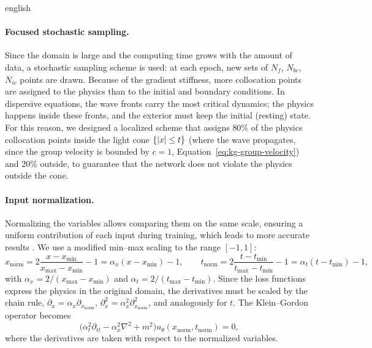 \begin{hyphenrules}{english}
\paragraph{Focused stochastic sampling.}\label{subsec:sampling}
Since the domain is large and the computing time grows with the amount of data, a stochastic sampling
scheme is used: at each epoch, new sets of $N_f$, $N_{bc}$, $N_{ic}$ points are drawn. Because of the
gradient stiffness, more collocation points are assigned to the physics than to the initial and boundary
conditions. In dispersive equations, the wave fronts carry the most critical dynamics; the physics happens
inside these fronts, and the exterior must keep the initial (resting) state. For this reason, we designed
a localized scheme that assigns $80\%$ of the physics collocation points inside the light cone
$\{\left\lvert x \right\rvert\le t\}$ (where the wave propagates, since the group velocity is bounded by $c=1$,
Equation~\eqref{eq:kg-group-velocity}) and $20\%$ outside, to guarantee that the network does not violate the physics
outside the cone.

\paragraph{Input normalization.}
Normalizing the variables allows comparing them on the same scale, ensuring a uniform contribution of each
input during training, which leads to more accurate results \cite{xu2025preprocessing}. We use a
modified min--max scaling to the range $[-1,1]$:
\begin{equation}
  x_{\mathrm{norm}}=2\frac{x-x_{\min}}{x_{\max}-x_{\min}}-1=\alpha_x(x-x_{\min})-1,\qquad
  t_{\mathrm{norm}}=2\frac{t-t_{\min}}{t_{\max}-t_{\min}}-1=\alpha_t(t-t_{\min})-1,
  \label{eq:normalization}
\end{equation}
with $\alpha_x=2/(x_{\max}-x_{\min})$ and $\alpha_t=2/(t_{\max}-t_{\min})$. Since the loss functions
express the physics in the original domain, the derivatives must be scaled by the chain rule,
$\partial_x=\alpha_x\partial_{x_{\mathrm{norm}}}$, $\partial_x^2=\alpha_x^2\partial^2_{x_{\mathrm{norm}}}$,
and analogously for $t$. The Klein--Gordon operator becomes
\begin{equation}
  \big(\alpha_t^2\partial_{tt}-\alpha_x^2\nabla^2+m^2\big)u_\theta(x_{\mathrm{norm}},t_{\mathrm{norm}})=0,
  \label{eq:kg-normalized}
\end{equation}
where the derivatives are taken with respect to the normalized variables.


\end{hyphenrules}
